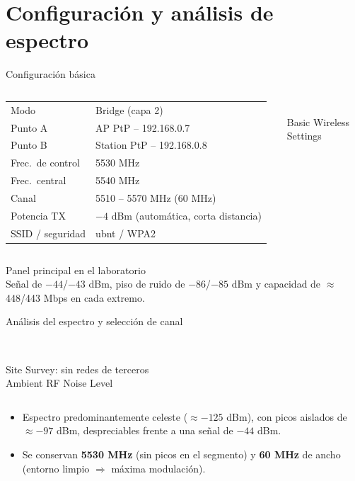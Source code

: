 \renewcommand{\seccorta}{Configuración}
\section{Configuración y análisis de espectro}

\begin{frame}{Configuración básica}
  \begin{columns}[c]
    \small
    \begin{tabularx}{\linewidth}{@{}lL@{}}
      \toprule
      Modo & Bridge (capa 2) \\
      Punto A & AP PtP -- 192.168.0.7 \\
      Punto B & Station PtP -- 192.168.0.8 \\
      Frec.\ de control & 5530 MHz \\
      Frec.\ central & 5540 MHz \\
      Canal & 5510 -- 5570 MHz (60 MHz) \\
      Potencia TX & $-4$ dBm (automática, corta distancia) \\
      SSID / seguridad & ubnt / WPA2 \\
      \bottomrule
    \end{tabularx}
    \centering
    \\
    {\scriptsize Basic Wireless Settings}
  \end{columns}
\end{frame}

\begin{frame}{Panel principal en el laboratorio}
  \centering
  \\[2pt]
  \small Señal de $-44$/$-43$ dBm, piso de ruido de $-86$/$-85$ dBm y capacidad de
  $\approx$448/443 Mbps en cada extremo.
\end{frame}

\begin{frame}{Análisis del espectro y selección de canal}
  \begin{columns}[c]
    \centering
    \\
    {\scriptsize Site Survey: sin redes de terceros}
    \centering
    \\
    {\scriptsize Ambient RF Noise Level}
  \end{columns}
  \vspace{4pt}
  \small
  \begin{itemize}
    \item Espectro predominantemente celeste ($\approx-125$ dBm), con picos aislados de $\approx-97$ dBm,
          despreciables frente a una señal de $-44$ dBm.
    \item Se conservan \textbf{5530 MHz} (sin picos en el segmento) y \textbf{60 MHz} de ancho
          (entorno limpio $\Rightarrow$ máxima modulación).
  \end{itemize}
\end{frame}
